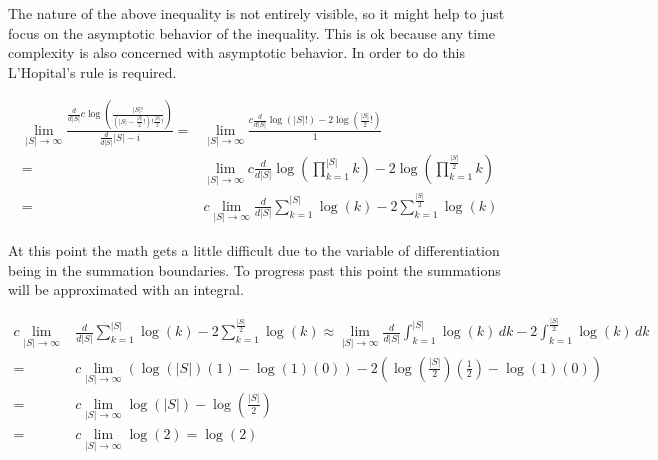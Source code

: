 \documentclass{article}
\begin{document}


The nature of the above inequality is not entirely visible, so it might help to just focus on the asymptotic behavior of the inequality. This is ok because any time complexity is also concerned with asymptotic behavior. In order to do this L'Hopital's rule is required.

\begin{equation*}
	\begin{split}
		\lim_{|S|\to \infty} \frac{
			\frac{d}{d|S|}				
			c \log \left( \frac{
				|S|!
			}{
				\left(|S|-\frac{|S|}{2}!\right)!\frac{|S|}{2}!
			} \right)
		}{
			\frac{d}{d|S|}
			|S|-i
		}
		= &
		\lim_{|S|\to \infty} \frac{
			c \frac{d}{d|S|}				
			\log \left( |S|! \right)-2\log \left( \frac{|S|}{2}! \right)
		}{
			1
		}
		\\
		= &
		\lim_{|S|\to \infty}
		c \frac{d}{d|S|}				
		\log \left( \prod_{k=1}^{|S|} k \right)-2\log \left( \prod_{k=1}^{\frac{|S|}{2}} k \right)
		\\
		= &
		c \lim_{|S|\to \infty}
		\frac{d}{d|S|}
		\sum_{k=1}^{|S|}\log(k)-2\sum_{k=1}^{\frac{|S|}{2}}\log(k)
	\end{split}
\end{equation*}

At this point the math gets a little difficult due to the variable of differentiation being in the summation boundaries. To progress past this point the summations will be approximated with an integral.

\begin{equation*}
	\begin{split}
		c \lim_{|S|\to \infty} &
		\frac{d}{d|S|}
		\sum_{k=1}^{|S|}\log(k)-2\sum_{k=1}^{\frac{|S|}{2}}\log(k)
		\approx
		\lim_{|S|\to \infty}
		\frac{d}{d|S|}
		\int_{k=1}^{|S|}\log(k)\,dk-2\int_{k=1}^{\frac{|S|}{2}}\log(k)\,dk
		\\		
		= &
		c \lim_{|S|\to \infty}
		\left(
			\log(|S|)(1)-\log(1)(0)
		\right)-2\left(
			\log\left( \frac{|S|}{2}	\right)\left( \frac{1}{2} \right)-\log(1)(0)
		\right)
		\\
		= &
		c \lim_{|S|\to \infty}
		\log(|S|)-\log\left(\frac{|S|}{2}\right)
		\\
		= &
		c \lim_{|S|\to \infty}
		\log(2)=\log(2)
	\end{split}
\end{equation*}
\end{document}
